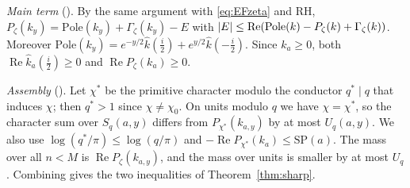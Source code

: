 \emph{Main term} (). By the same argument with \eqref{eq:EFzeta} and RH,
$P_\zeta(k_y)=\mathrm{Pole}(k_y)+\Gamma_\zeta(k_y)-E$ with $\left\lvert E \right\rvert\le\operatorname{Re}(\mathrm{Pole}(k)-P_\zeta(k)+\Gamma_\zeta(k))$.
Moreover $\mathrm{Pole}(k_y)=e^{-y/2}\hat k(\frac i2)+e^{y/2}\hat k(-\frac i2)$. Since $k_a\ge0$, both
$\operatorname{Re}\hat k_a(\frac i2)\ge0$ and $\operatorname{Re}P_\zeta(k_a)\ge0$.

\emph{Assembly} (). Let $\chi^*$ be the primitive character modulo the conductor
$q^*\mid q$ that induces $\chi$; then $q^*>1$ since $\chi\ne\chi_0$. On units modulo $q$ we have $\chi=\chi^*$,
so the character sum over $S_q(a,y)$ differs from $P_{\chi^*}(k_{a,y})$ by at most $U_q(a,y)$. We also use
$\log(q^*/\pi)\le\log(q/\pi)$ and $-\operatorname{Re}P_{\chi^*}(k_a)\le\mathrm{SP}(a)$. The mass over all $n<M$ is
$\operatorname{Re}P_\zeta(k_{a,y})$, and the mass over units is smaller by at most $U_q$. Combining gives the two
inequalities of Theorem~\ref{thm:sharp}.


